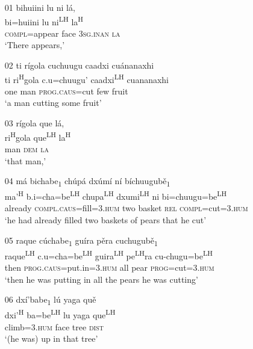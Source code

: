 \ea 
\begin{itemize}
\item[01]
\glll bihuiini lu ni l\'{a}, \\
bi=huiini lu ni\textsuperscript{LH} la\textsuperscript{H} \\
\textsc{compl}=appear face \textsc{3sg.inan} \textsc{la} \\
\glt `There appears,'


\item[02]
\glll ti r\'{i}gola cuchuugu caadxi cu\'{a}nanaxhi \\
ti ri\textsuperscript{H}gola c.u=chuugu' caadxi\textsuperscript{LH} cuananaxhi \\
one man \textsc{prog}.\textsc{caus}=cut few fruit \\
\glt `a man cutting some fruit'


\item[03]
\glll r\'{i}gola que l\'{a},  \\
ri\textsuperscript{H}gola que\textsuperscript{LH} la\textsuperscript{H} \\
man \textsc{dem} \textsc{la} \\
\glt `that man,'


\item[04]
\glll m\'{a} bichabe\textsubscript{1} ch\'{u}p\'{a} dx\'{u}m\'{i} n\'{i} b\'{i}chuugub\v{e}\textsubscript{1} \\
ma'\textsuperscript{H} b.i=cha=be\textsuperscript{LH}  chupa\textsuperscript{LH} dxumi\textsuperscript{LH} ni bi=chuugu=be\textsuperscript{LH}  \\
already \textsc{compl}.\textsc{caus}=fill=\textsc{3.hum} two basket \textsc{rel} \textsc{compl}=cut=\textsc{3.hum} \\
\glt `he had already filled two baskets of pears that he cut'


\item[05]
\glll raque c\'{u}chabe\textsubscript{1} gu\'{i}ra p\v{e}ra cuchugub\v{e}\textsubscript{1} \\
raque\textsuperscript{LH} c.u=cha=be\textsuperscript{LH}  guira\textsuperscript{LH} pe\textsuperscript{LH}ra cu-chugu=be\textsuperscript{LH}  \\
then \textsc{prog}.\textsc{caus}=put.in=\textsc{3.hum} all pear \textsc{prog}=cut=\textsc{3.hum} \\
\glt `then he was putting in all the pears he was cutting'


\item[06]
\glll dx\'{i}'babe\textsubscript{1} l\'{u} yaga qu\v{e} \\
dxi'\textsuperscript{H} ba=be\textsuperscript{LH}  lu yaga que\textsuperscript{LH} \\
climb=\textsc{3.hum} face tree \textsc{dist} \\
\glt `(he was) up in that tree'



\end{itemize}
